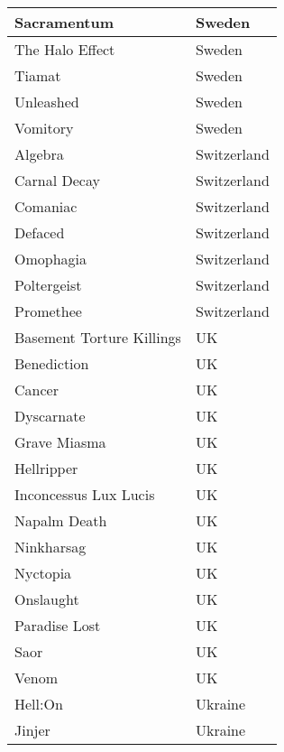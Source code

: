 \documentclass[12pt, a4paper, twoside]{report}
\begin{document}
\begin{center}
\begin{longtable}{|p{5cm}|p{5cm}|}
Sacramentum﻿ & Sweden \\ \hline
The Halo Effect & Sweden \\ \hline
Tiamat & Sweden \\ \hline
Unleashed & Sweden \\ \hline
Vomitory & Sweden \\ \hline
Algebra & Switzerland \\ \hline
Carnal Decay & Switzerland \\ \hline
Comaniac & Switzerland \\ \hline
Defaced & Switzerland \\ \hline
Omophagia & Switzerland \\ \hline
Poltergeist & Switzerland \\ \hline
Promethee & Switzerland \\ \hline
Basement Torture Killings & UK \\ \hline
Benediction & UK \\ \hline
Cancer & UK \\ \hline
Dyscarnate & UK \\ \hline
Grave Miasma & UK \\ \hline
Hellripper & UK \\ \hline
Inconcessus Lux Lucis & UK \\ \hline
Napalm Death & UK \\ \hline
Ninkharsag & UK \\ \hline
Nyctopia & UK \\ \hline
Onslaught & UK \\ \hline
Paradise Lost & UK \\ \hline
Saor & UK \\ \hline
Venom & UK \\ \hline
Hell:On & Ukraine \\ \hline
Jinjer & Ukraine \\ \hline
		\end{longtable}
	\end{center}
\end{document}
